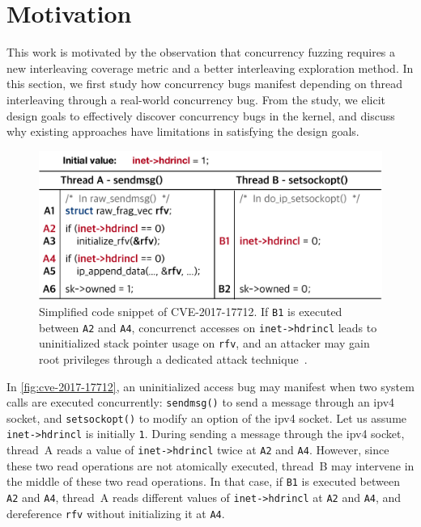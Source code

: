 \section{Motivation}
\label{s:motivation}


This work is motivated by the observation that concurrency fuzzing
requires a new interleaving coverage metric and a better interleaving
exploration method.
%
In this section, we first study how concurrency bugs manifest
depending on thread interleaving through a real-world concurrency bug.
From the study, we elicit design goals to effectively discover
concurrency bugs in the kernel, and discuss why existing approaches
have limitations in satisfying the design goals.

%

%
\begin{figure}[t]
  \centering
  \includegraphics[width=0.85\linewidth]{fig/cve-2017-10661.pdf}
  \caption{Simplified code snippet of CVE-2017-17712. If \texttt{B1}
    is executed between \texttt{A2} and \texttt{A4}, concurrenct
    accesses on \texttt{inet->hdrincl} leads to uninitialized stack
    pointer usage on \texttt{rfv}, and an attacker may gain root
    privileges through a dedicated attack
    technique~\cite{stackspray}.}
  \label{fig:cve-2017-17712}
\end{figure}
%
In \autoref{fig:cve-2017-17712}, an uninitialized access bug may
manifest when two system calls are executed concurrently:
\texttt{sendmsg()} to send a message through an ipv4 socket, and
\texttt{setsockopt()} to modify an option of the ipv4 socket.
Let us assume \texttt{inet->hdrincl} is initially \texttt{1}.
%
During sending a message through the ipv4 socket, thread~A reads a
value of \texttt{inet->hdrincl} twice at \texttt{A2} and \texttt{A4}.
%
However, since these two read operations are not atomically executed,
thread~B may intervene in the middle of these two read operations.
%
In that case, if \texttt{B1} is executed between \texttt{A2} and
\texttt{A4}, thread~A reads different values of \texttt{inet->hdrincl}
at \texttt{A2} and \texttt{A4}, and dereference \texttt{rfv} without
initializing it at \texttt{A4}.


